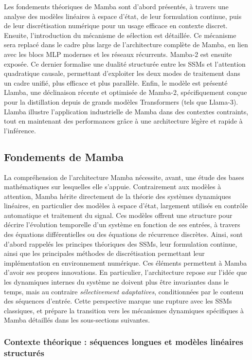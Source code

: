 Les fondements théoriques de Mamba sont d'abord présentés, à travers une analyse des modèles linéaires à espace d’état, de leur formulation continue, puis de leur discrétisation numérique pour un usage efficace en contexte discret. Ensuite, l’introduction du mécanisme de sélection est détaillée. Ce mécanisme sera replacé dans le cadre plus large de l’architecture complète de Mamba, en lien avec les blocs MLP modernes et les réseaux récurrents. Mamba-2 est ensuite exposée. Ce dernier formalise une dualité structurée entre les SSMs et l’attention quadratique causale, permettant d’exploiter les deux modes de traitement dans un cadre unifié, plus efficace et plus parallèle. Enfin,  le modèle est présenté Llamba, une déclinaison récente et optimisée de Mamba-2, spécifiquement conçue pour la distillation depuis de grands modèles Transformers (tels que Llama-3). Llamba illustre l'application industrielle de Mamba dans des contextes contraints, tout en maintenant des performances grâce à une architecture légère et rapide à l’inférence.

\subsection{Fondements de Mamba}

La compréhension de l’architecture Mamba nécessite, avant, une étude des bases mathématiques sur lesquelles elle s’appuie. Contrairement aux modèles à attention, Mamba hérite directement de la théorie des systèmes dynamiques linéaires, en particulier des modèles à espace d’état, largement utilisés en contrôle automatique et traitement du signal. Ces modèles offrent une structure pour décrire l’évolution temporelle d’un système en fonction de ses entrées, à travers des équations différentielles ou des équations de récurrence discrètes. Ainsi, sont d’abord rappelés les principes théoriques des SSMs, leur formulation continue, ainsi que les principales méthodes de discrétisation permettant leur implémentation en environnement numérique. Ces éléments permettent à Mamba d'avoir ses propres innovations. En particulier, l’architecture repose sur l’idée que les dynamiques internes du système ne doivent plus être invariantes dans le temps, mais au contraire \textit{sélectivement adaptatives}, conditionnées par le contenu des séquences d’entrée. Cette perspective marque une rupture avec les SSMs classiques, et prépare la transition vers les mécanismes dynamiques spécifiques à Mamba détaillés dans les sous-sections suivantes.

\subsubsection{Contexte théorique : séquences longues et modèles linéaires structurés}

